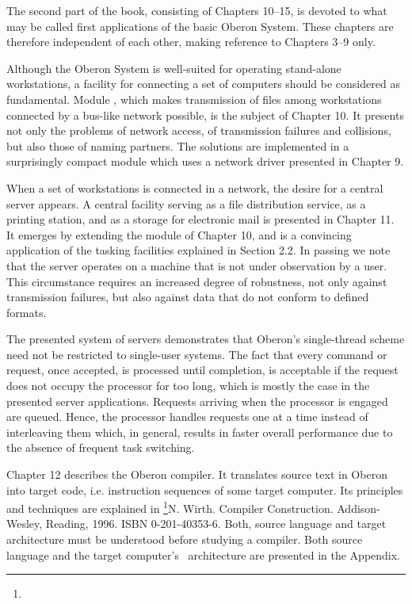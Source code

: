 The second part of the book, consisting of Chapters 10--15, is
devoted to what may be called first applications of the basic Oberon
System. These chapters are therefore independent of each other, making
reference to Chapters 3--9 only.

Although the Oberon System is well-suited for operating stand-alone
workstations, a facility for connecting a set of computers should be
considered as fundamental. Module , which makes transmission of
files among workstations connected by a bus-like network possible, is
the subject of Chapter 10. It presents not only the problems of
network access, of transmission failures and collisions, but also
those of naming partners. The solutions are implemented in a
surprisingly compact module which uses a network driver presented in
Chapter 9.

When a set of workstations is connected in a network, the desire for a
central server appears. A central facility serving as a file
distribution service, as a printing station, and as a storage for
electronic mail is presented in Chapter 11. It emerges by extending
the  module of Chapter 10, and is a convincing application of the
tasking facilities explained in Section 2.2. In passing we note that
the server operates on a machine that is not under observation by a
user. This circumstance requires an increased degree of robustness,
not only against transmission failures, but also against data that do
not conform to defined formats.

The presented system of servers demonstrates that Oberon's
single-thread scheme need not be restricted to single-user
systems. The fact that every command or request, once accepted, is
processed until completion, is acceptable if the request does not
occupy the processor for too long, which is mostly the case in the
presented server applications. Requests arriving when the processor is
engaged are queued. Hence, the processor handles requests one at a
time instead of interleaving them which, in general, results in faster
overall performance due to the absence of frequent task switching.

Chapter 12 describes the Oberon compiler. It translates source text in
Oberon into target code, i.e. instruction sequences of some target
computer. Its principles and techniques are explained in \footnote{{\mc[6]}}{N. Wirth. Compiler Construction. Addison-Wesley, Reading, 1996. ISBN 0-201-40353-6}. Both,
source language and target architecture must be understood before
studying a compiler. Both source language and the target computer's
\RISC\ architecture are presented in the Appendix.


